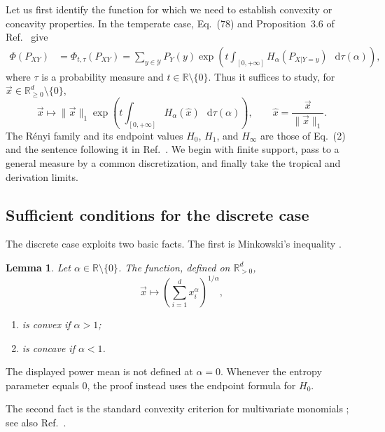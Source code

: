 \documentclass[11pt]{article}
\newtheorem{lemma}[theorem]{Lemma}
\theoremstyle{definition}
\newcommand{\R}{\mathbb{R}}
\newcommand{\Y}{\mathcal{Y}}
\def\d{\mathop{}\!\mathrm{d}}
\begin{document}
Let us first identify the function for which we need to establish convexity or
concavity properties.  In the temperate case, Eq.~(78) and Proposition~3.6 of
Ref.~\cite{rubboli2026complete} give
\begin{align}
\label{eq:TemperateForm}
\Phi(P_{XY})&=\Phi_{t,\tau}(P_{XY})
=\sum_{y\in\Y}P_Y(y)
  \exp\!\left(t\int_{[0,+\infty]}H_\alpha(P_{X|Y=y})\,
  \d\tau(\alpha)\right),
\end{align}
where $\tau$ is a probability measure and
$t\in\R\setminus\{0\}$.  Thus it suffices to study, for
$\vec{x}\in\R^d_{\geq0}\setminus\{0\}$,
\begin{equation}
\label{eq:conditionfunct}
\vec{x}\longmapsto
\|\vec{x}\|_1\exp\!\left(
t\int_{[0,+\infty]}H_\alpha(\hat{x})\,\d\tau(\alpha)
\right),
\qquad
\hat{x}=\frac{\vec{x}}{\|\vec{x}\|_1}.
\end{equation}
The R\'enyi family and its endpoint values $H_0$, $H_1$, and $H_\infty$ are those
of Eq.~(2) and the sentence following it in Ref.~\cite{rubboli2026complete}.
We begin with finite support, pass to a general
measure by a common discretization, and finally take the tropical and derivation
limits.

\subsection{Sufficient conditions for the discrete case}

The discrete case exploits two basic facts.  The first is Minkowski's inequality
\cite[Theorem~9]{bullen2013handbook}.

\begin{lemma}
\label{lem:Minkowski}
Let $\alpha\in\R\setminus\{0\}$.  The function, defined on
$\R^d_{>0}$,
\begin{equation}
\vec{x}\longmapsto\left(\sum_{i=1}^d x_i^\alpha\right)^{1/\alpha},
\end{equation}
\begin{enumerate}[itemsep=1pt]
\item is convex if $\alpha>1$;
\item is concave if $\alpha<1$.
\end{enumerate}
\end{lemma}

The displayed power mean is not defined at $\alpha=0$.  Whenever the entropy
parameter equals $0$, the proof instead uses the endpoint formula for $H_0$.

The second fact is the standard convexity criterion for multivariate monomials
\cite[Lemma~8]{mu21_renyi}; see also Ref.~\cite[Proposition~13]{farooq2024matrix}.
\end{document}
